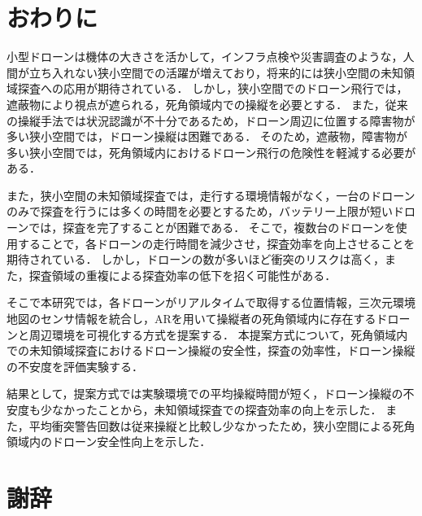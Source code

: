\documentclass[a4paper,11pt]{ujreport}
\begin{document}
\chapter{おわりに}
\label{chap:Conclusion}

小型ドローンは機体の大きさを活かして，インフラ点検や災害調査のような，人間が立ち入れない狭小空間での活躍が増えており，将来的には狭小空間の未知領域探査への応用が期待されている．
しかし，狭小空間でのドローン飛行では，遮蔽物により視点が遮られる，死角領域内での操縦を必要とする．
また，従来の操縦手法では状況認識が不十分であるため，ドローン周辺に位置する障害物が多い狭小空間では，ドローン操縦は困難である．
そのため，遮蔽物，障害物が多い狭小空間では，死角領域内におけるドローン飛行の危険性を軽減する必要がある．

また，狭小空間の未知領域探査では，走行する環境情報がなく，一台のドローンのみで探査を行うには多くの時間を必要とするため，バッテリー上限が短いドローンでは，探査を完了することが困難である．
そこで，複数台のドローンを使用することで，各ドローンの走行時間を減少させ，探査効率を向上させることを期待されている．
しかし，ドローンの数が多いほど衝突のリスクは高く，また，探査領域の重複による探査効率の低下を招く可能性がある．

そこで本研究では，各ドローンがリアルタイムで取得する位置情報，三次元環境地図のセンサ情報を統合し，ARを用いて操縦者の死角領域内に存在するドローンと周辺環境を可視化する方式を提案する．
本提案方式について，死角領域内での未知領域探査におけるドローン操縦の安全性，探査の効率性，ドローン操縦の不安度を評価実験する．

結果として，提案方式では実験環境での平均操縦時間が短く，ドローン操縦の不安度も少なかったことから，未知領域探査での探査効率の向上を示した．
また，平均衝突警告回数は従来操縦と比較し少なかったため，狭小空間による死角領域内のドローン安全性向上を示した．\\

\clearpage

\chapter*{謝辞}
\label{chap:Acknowledgments}
\end{document}

